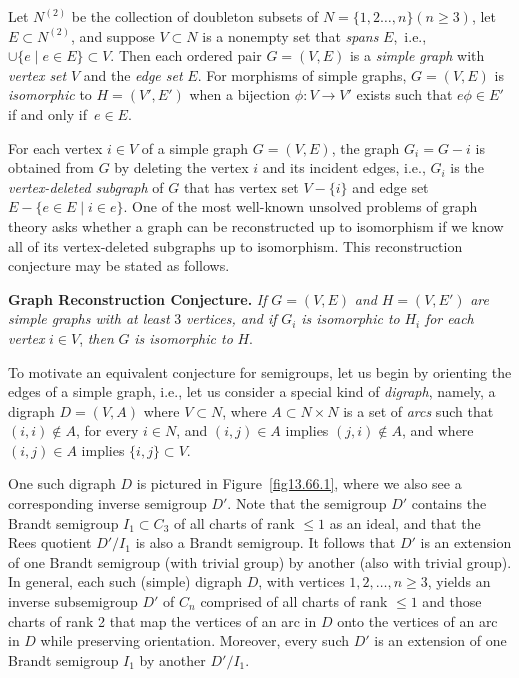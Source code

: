 \documentclass{surv-l}
\numberwithin{equation}{section}
\numberwithin{table}{section}
\numberwithin{figure}{section}
\theoremstyle{definition}
\begin{document}
Let $N^{(2)}$ be the collection of doubleton subsets of
$N=\{1,2\ldots, n\} (n\geq 3)$, let $E\subset N^{(2)}$, and
suppose $V \subset N$ is a nonempty set that \emph{spans}
$E$,~i.e., $\cup\{e \mid e\in E\}\subset V$. Then each ordered
pair $G=(V, E)$ is a \emph{simple graph} with \emph{vertex
set} $V$ and the \emph{edge set} $E$. For
morphisms of simple graphs, $G=(V, E)$ is \emph{isomorphic} to
$H=(V', E')$ when a bijection $\phi : V\rightarrow V'$ exists such
that $e\phi\in E'$ if and only if~$e\in E$.

For each vertex $i\in V$ of a simple graph $G=(V, E)$, the graph
$G_{i}=G-i$ is obtained from $G$ by deleting the vertex $i$ and
its incident edges, i.e., $G_{i}$ is the \emph{vertex-deleted
subgraph} of $G$ that has vertex
set $V-\{i\}$ and edge set $E-\{e\in E\mid i\in e\}$. One of
the most well-known unsolved problems of graph theory asks whether
a graph can be reconstructed up to
isomorphism if we know all of its vertex-deleted subgraphs up to
isomorphism. This reconstruction conjecture may be stated as follows.

 \textbf{Graph Reconstruction Conjecture.} \emph{If} $G=(V, E)$
\emph{and} $H=(V, E')$ \emph{are simple graphs with at least} 3
\emph{vertices, and if} $G_{i}$ \emph{is isomorphic to} $H_{i}$
\emph{for each vertex} $i\in V$, \emph{then} $G$ \emph{is
isomorphic to} $H$.

To motivate an equivalent conjecture for semigroups, let us begin
by orienting the edges of a simple graph, i.e., let us consider a
special kind of \emph{digraph}, namely, a
digraph $D=(V, A)$ where $V \subset N$, where $A\subset N\times N$
is a set of \emph{arcs} such that $(i, i)\not\in A$, for every
$i\in N$, and $(i,j)\in A$ implies $(j, i)\not\in A$, and where
$(i,j)\in A$ implies $\{i,j\}\subset V$.

One such digraph $D$ is pictured in Figure~\ref{fig13.66.1}, where
we also see a corresponding inverse semigroup $D'$. Note that the
semigroup $D'$ contains the Brandt semigroup
$I_{1}\subset C_{3}$ of all charts of rank $\leq 1$ as an ideal,
and that the Rees quotient $D'/I_{1}$ is also
a Brandt semigroup. It follows that $D'$ is an extension of one
Brandt semigroup (with trivial group) by another (also with
trivial group). In general, each such (simple) digraph $D$, with
vertices $1,2,\ldots,n \geq 3$, yields an inverse subsemigroup
$D'$ of $C_{n}$ comprised of all charts of rank $\leq 1$ and those
charts of rank 2 that map the vertices of an arc in $D$ onto the
vertices of an arc in $D$ while preserving orientation. Moreover,
every such $D'$ is an extension of one Brandt semigroup $I_{1}$ by
another $D'/I_{1}$.
\end{document}
